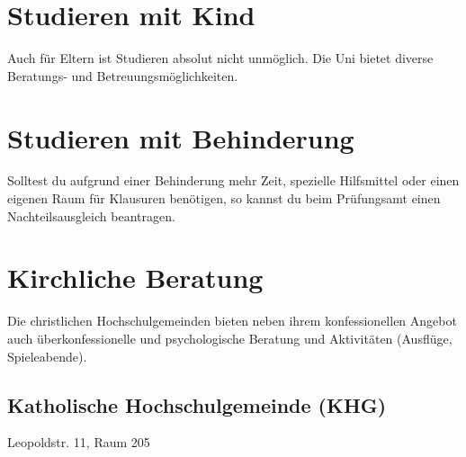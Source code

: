 \begin{urlList}
\end{urlList}

\section{Studieren mit Kind}

Auch für Eltern ist Studieren absolut nicht unmöglich. Die Uni bietet diverse Beratungs- und Betreuungsmöglichkeiten.

\begin{urlList}
\end{urlList}

\section{Studieren mit Behinderung}

Solltest du aufgrund einer Behinderung mehr Zeit, spezielle Hilfsmittel oder einen eigenen Raum für Klausuren benötigen, so kannst du beim Prüfungsamt einen Nachteilsausgleich beantragen.

\begin{urlList}
\end{urlList}



\section{Kirchliche Beratung}
Die christlichen Hochschulgemeinden bieten neben ihrem konfessionellen Angebot auch überkonfessionelle und psychologische Beratung und Aktivitäten (Ausflüge, Spieleabende).
\newpage
\subsection*{Katholische Hochschulgemeinde (KHG)}
Leopoldstr. 11, Raum 205

\begin{urlList}
\end{urlList}

